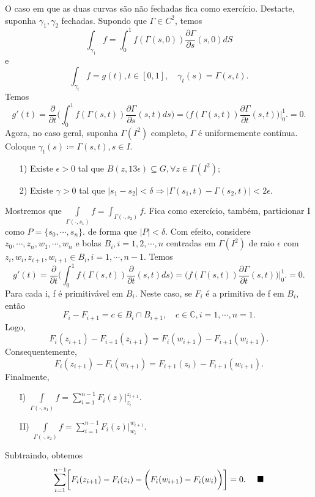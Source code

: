 \documentclass[ComplexAnalysis/complex.tex]{subfiles}
\begin{document}
\begin{proof*}
	O caso em que as duas curvas são não fechadas fica como exercício. Destarte, suponha $\gamma_{1}, \gamma_{2}$ fechadas.
	Supondo que $\Gamma\in{C^{2}}$, temos
	$$
		\int_{\gamma_{1}}^{}f = \int_{0}^{1}f(\Gamma(s, 0))\frac{\partial{\Gamma}}{\partial{s}}(s, 0)dS
	$$
	e
	$$
		\int_{\gamma_{t}}^{}f = g(t), t\in[0, 1], \quad \gamma_{t}(s) = \Gamma(s, t).
	$$
	Temos
	$$
		g'(t) = \frac{\partial{}}{\partial{t}}\biggl(\int_{0}^{1}f(\Gamma(s, t))\frac{\partial{\Gamma}}{\partial{s}}(s, t)ds\biggr) = \biggl(f(\Gamma(s,t ))\frac{\partial{\Gamma}}{\partial{t}}(s, t)\biggr)\biggl|_0^1\biggr. = 0.
	$$
	Agora, no caso geral, suponha $\Gamma(I^2)$ completo, $\Gamma$ é uniformemente contínua. Coloque $\gamma_{t}(s)\coloneqq  \Gamma(s, t), s\in{I}.$
	\begin{itemize}
		\item[1)] Existe $\epsilon > 0$ tal que $B(z, 13 \epsilon)\subseteq{G},\forall z\in{\Gamma(I^2)};$
		\item[2)] Existe $\gamma > 0$ tal que $|s_1 - s_2| < \delta\Rightarrow |\Gamma(s_1, t) - \Gamma(s_2, t)| < 2 \epsilon.$
	\end{itemize}
	Mostremos que $\int\limits_{\Gamma(\cdot, s_1)}^{}f = \int_{\Gamma(\cdot, s_2)}^{}f.$ Fica como exercício, também, particionar
	I como $P=\{s_{0}, \cdots, s_{n}\}.$ de forma que $|P| < \delta.$ Com efeito, considere $z_{0}, \cdots, z_{n}, w_{1}, \cdots, w_{n}$ e bolas
	$B_{i}, i = 1, 2, \cdots, n$ centradas em $\Gamma(I^2)$ de raio $\epsilon$ com $z_{i}, w_{i}, z_{i+1}, w_{i+1}\in{B_{i}}, i = 1, \cdots, n-1.$
	Temos
	$$
		g'(t) = \frac{\partial{}}{\partial{t}}\biggl(\int_{0}^{1}f(\Gamma(s, t))\frac{\partial{}}{\partial{t}}(s, t)ds\biggr) = \biggl(f(\Gamma(s, t))\frac{\partial{\Gamma}}{\partial{t}}(s, t)\biggr)\biggl|_0^1\biggr. = 0.
	$$
	Para cada i, f é primitivável em $B_{i}.$ Neste caso, se $F_{i}$ é a primitiva de f em $B_{i}$, então
	$$
		F_{i} - F_{i+1} = c \in B_{i}\cap{B_{i+1}}, \quad c\in \mathbb{C}, i=1, \cdots, n=1.
	$$
	Logo,
	$$
		F_{i}(z_{i+1}) - F_{i+1}(z_{i+1}) = F_{i}(w_{i+1}) - F_{i+1}(w_{i+1}).
	$$
	Consequentemente,
	$$
		F_{i}(z_{i+1}) - F_{i}(w_{i+1}) = F_{i+1}(z_{i}) - F_{i+1}(w_{i+1}).
	$$
	Finalmente,
	\begin{itemize}
		\item[I)] $\int\limits_{\Gamma(\cdot, s_{1})}^{}f = \sum\limits_{i=1}^{n-1}F_{i}(z)\biggl|_{z_{i}}^{z_{i+1}}\biggr.$
		\item[II)] $\int\limits_{\Gamma(\cdot, s_2)}^{}f = \sum\limits_{i=1}^{n-1}F_{i}(z)\biggl|_{w_{i}}^{w_{i+1}}\biggr.$
	\end{itemize}
	Subtraindo, obtemos
	$$
		\sum\limits_{i=1}^{n-1}\biggl[F_{i}(z_{i+1}) - F_{i}(z_{i}) - \biggl(F_{i}(w_{i+1}) - F_{i}(w_{i})\biggr)\biggr] = 0.\quad\text{ $\blacksquare$}
	$$
\end{proof*}
\end{document}
